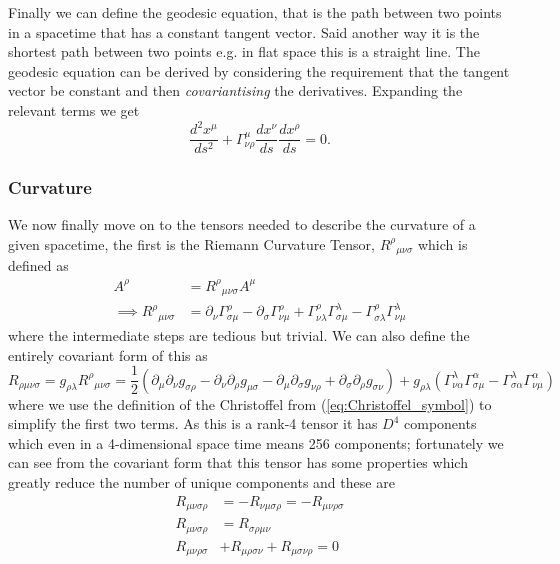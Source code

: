 \documentclass[12pt]{article}
\numberwithin{equation}{section}
\numberwithin{figure}{section}
\begin{document}
Finally we can define the geodesic equation, that is the path between two points in a spacetime that has a constant tangent vector. Said another way it is the shortest path between two points e.g. in flat space this is a straight line. The geodesic equation can be derived by considering the requirement that the tangent vector be constant and then \emph{covariantising} the derivatives. Expanding the relevant terms we get 
\begin{equation}
	\frac{d^2x^\mu}{ds^2} + \Gamma^{\mu}_{\nu\rho}\frac{dx^\nu}{ds}\frac{dx^\rho}{ds} = 0.
\end{equation}
\subsubsection{Curvature} %
\label{subsub:curvature}
We now finally move on to the tensors needed to describe the curvature of a given spacetime, the first is the Riemann Curvature Tensor, ${R^\rho}_{\mu\nu\sigma}$ which is defined as
\begin{align}
	[D_\nu,D_\sigma]A^\rho &= {R^\rho}_{\mu\nu\sigma} A^\mu \\
	\implies {R^\rho}_{\mu\nu\sigma} &= \partial_\nu \Gamma^{\rho}_{\sigma\mu} - \partial_\sigma \Gamma^{\rho}_{\nu\mu} + \Gamma^{\rho}_{\nu \lambda}\Gamma^{\lambda}_{\sigma\mu} - \Gamma^{\rho}_{\sigma \lambda}\Gamma^{\lambda}_{\nu \mu} \label{eq:riemann}
\end{align}
where the intermediate steps are tedious but trivial. We can also define the entirely covariant form of this as
\begin{equation}
 	R_{\rho\mu\nu\sigma}=g_{\rho\lambda}{R^\rho}_{\mu\nu\sigma}= \frac{1}{2}\left(\partial_{\mu}\partial_{\nu}g_{\sigma\rho}-\partial_{\nu}\partial_{\rho}g_{\mu\sigma} -\partial_{\mu}\partial_{\sigma}g_{\nu\rho} + \partial_{\sigma}\partial_{\rho}g_{\sigma\nu}  \right) + g_{\rho\lambda}\left(\Gamma^{\lambda}_{\nu \alpha}\Gamma^{\alpha}_{\sigma\mu} - \Gamma^{\lambda}_{\sigma \alpha}\Gamma^{\alpha}_{\nu \mu}\right)
\end{equation}
where we use the definition of the Christoffel from (\ref{eq:Christoffel_symbol}) to simplify the first two terms. As this is a rank-4 tensor it has $D^4$ components which even in a 4-dimensional space time means 256 components; fortunately we can see from the covariant form that this tensor has some properties which greatly reduce the number of unique components and these are
\begin{align}
	R_{\mu\nu\sigma\rho} &= -R_{\nu\mu\sigma\rho} = -R_{\mu\nu\rho\sigma} \label{eq:riemann-prop-1}\\
	R_{\mu\nu\sigma\rho} &= R_{\sigma\rho\mu\nu} \\
	R_{\mu\nu\rho\sigma} &+ R_{\mu\rho\sigma\nu} + R_{\mu\sigma\nu\rho} = 0 \label{eq:riemann-prop-3}
\end{align}
\end{document}
